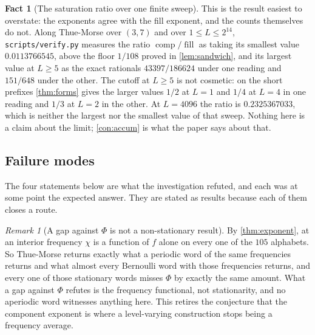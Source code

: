 \documentclass[11pt]{amsart}
\theoremstyle{definition}
\newtheorem{fact}[theorem]{Fact}
\theoremstyle{remark}
\newtheorem{remark}[theorem]{Remark}
\newcommand{\vpy}{\texttt{scripts/\allowbreak verify.py}}
\DeclareMathOperator{\comp}{comp}
\DeclareMathOperator{\fil}{fill}
\begin{document}
\begin{fact}[The saturation ratio over one finite sweep]
\label{fact:saturation}
This is the result easiest to overstate: the exponents agree with the fill exponent, and the counts themselves do not. Along Thue-Morse over $(3,7)$ and over $1 \le L \le 2^{14}$, \vpy{} measures the ratio $\comp/\fil$ as taking its smallest value $0.0113766545$, above the floor $1/108$ proved in \cref{lem:sandwich}, and its largest value at $L \ge 5$ as the exact rationals $43397/186624$ under one reading and $151/648$ under the other. The cutoff at $L \ge 5$ is not cosmetic: on the short prefixes \cref{thm:forms} gives the larger values $1/2$ at $L = 1$ and $1/4$ at $L = 4$ in one reading and $1/3$ at $L = 2$ in the other. At $L = 4096$ the ratio is $0.2325367033$, which is neither the largest nor the smallest value of that sweep. Nothing here is a claim about the limit; \cref{con:accum} is what the paper says about that.
\end{fact}

\subsection{Failure modes}

The four statements below are what the investigation refuted, and each was at some point the expected answer. They are stated as results because each of them closes a route.

\begin{remark}[A gap against $\Phi$ is not a non-stationary result]
\label{rem:payoff}
By \cref{thm:exponent}, at an interior frequency $\chi$ is a function of $f$ alone on every one of the $105$ alphabets. So Thue-Morse returns exactly what a periodic word of the same frequencies returns and what almost every Bernoulli word with those frequencies returns, and every one of those stationary words misses $\Phi$ by exactly the same amount. What a gap against $\Phi$ refutes is the frequency functional, not stationarity, and no aperiodic word witnesses anything here. This retires the conjecture that the component exponent is where a level-varying construction stops being a frequency average.
\end{remark}
\end{document}
